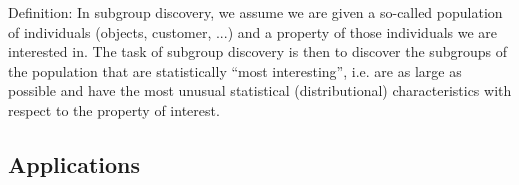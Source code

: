 Definition: In subgroup discovery, we assume we are given a so-called population of individuals (objects, customer, ...) and a property of those individuals we are interested in. The task of subgroup discovery is then to discover the subgroups of the population that are statistically “most interesting”, i.e. are as large as possible and have the most unusual statistical (distributional) characteristics with respect to the property of interest. \cite{herrera2011overview}

\subsection{Applications}






